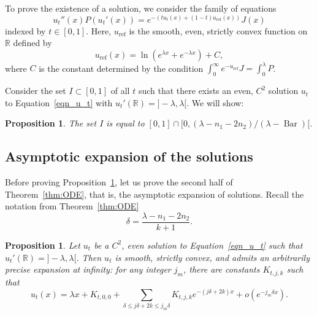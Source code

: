 \documentclass[10pt]{amsart}
\theoremstyle{plain}
\newtheorem{prop}[thm]{Proposition}
\theoremstyle{definition}
\DeclareMathOperator{\barDH}{Bar}
\begin{document}
To prove the existence of a solution, we consider the family of equations
\begin{equation}
\label{eqn_u_t}
u_t''(x)P(u_t'(x))=e^{-(tu_t(x)+(1-t)u_{\mathrm{ref}}(x))}J(x)
\end{equation}
indexed by $t\in [0,1]$.
Here, $u_{\mathrm{ref}}$ is the smooth, even, strictly convex function
on $\mathbb{R}$ defined by
\begin{equation}
u_{\mathrm{ref}}(x)=\ln(e^{\lambda x}+e^{-\lambda x})+C,
\end{equation}
where $C$ is the constant determined by the condition
$\int_0^{\infty}e^{-u_{\mathrm{ref}}}J = \int_0^{\lambda}P$.

Consider the set $I\subset [0,1]$ of all $t$ such that there exists an even, $C^2$
solution $u_t$ to Equation~\eqref{eqn_u_t} with $u_t'(\mathbb{R})={}]-\lambda,\lambda[$.
We will show:

\begin{prop}
\label{prop:cont}
The set $I$ is equal to
$ [0,1]\cap [0,(\lambda-n_1-2n_2)/(\lambda-\barDH)[$.
\end{prop}

\subsection{Asymptotic expansion of the solutions}

Before proving Proposition~\ref{prop:cont}, let us prove the second half of Theorem~\ref{thm:ODE},
that is, the asymptotic expansion of solutions.
Recall the notation from Theorem~\ref{thm:ODE}
\[ \delta=\frac{\lambda-n_1-2n_2}{k+1}. \]

\begin{prop}
\label{prop:cont-exp}
Let $u_t$ be a $C^2$, even solution to Equation~\eqref{eqn_u_t}
such that $u_t'(\mathbb{R})={}]-\lambda,\lambda[$. Then $u_t$ is smooth,
strictly convex, and admits an arbitrarily precise expansion at infinity:
for any integer $j_m$, there are constants $K_{t,j,k}$
such that
\[ u_t(x)= \lambda x +K_{t,0,0}+
\sum_{\delta\leq j\delta+2k\leq j_m\delta}K_{t,j,k}e^{-(j\delta+2k)x}
+o(e^{-j_m\delta x}). \]
\end{prop}
\end{document}
